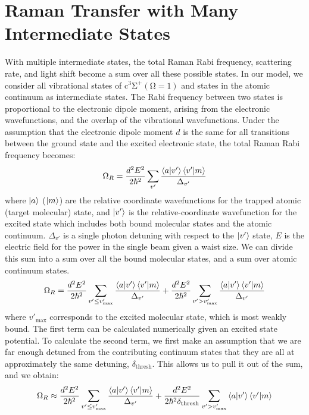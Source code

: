 \documentclass[aps,secnumarabic,amsmath,amssymb,10pt,superscriptaddress]{revtex4}
\begin{document}
\section{Raman Transfer with Many Intermediate States} \label{sm:sect_2}
With multiple intermediate states, the total Raman Rabi frequency, scattering rate, and light shift become a sum over all these possible states. In our model, we consider all vibrational states of $ \mathrm{c^3\Sigma^+(\Omega = 1)} $ and states in the atomic continuum as intermediate states. The Rabi frequency between two states is proportional to the electronic dipole moment, arising from the electronic wavefunctions, and the overlap of the vibrational wavefunctions. Under the assumption that the electronic dipole moment $ d $ is the same for all transitions between the ground state and the excited electronic state, the total Raman Rabi frequency becomes:
\begin{equation}
  \Omega_R = \frac{d^2E^2}{2\hbar^2} \displaystyle\sum_{v'} \frac{\braket{a|v'}\braket{v'|m}}{\Delta_{v'}}
\end{equation}
where $\ket{a}$ ($\ket{m}$) are the relative coordinate wavefunctions for the trapped atomic (target molecular) state, and $\ket{v'}$ is the relative-coordinate wavefunction for the excited state which includes both bound molecular states and the atomic continuum. $\Delta_{v'}$ is a single photon detuning with respect to the $\ket{v'}$ state, $ E $ is the electric field for the power in the single beam given a waist size. We can divide this sum into a sum over all the bound molecular states, and a sum over atomic continuum states.
\begin{equation}
  \Omega_R = \frac{d^2E^2}{2\hbar^2}\displaystyle\sum_{v' \leq v'_{\text{max}}} \frac{\braket{a|v'}\braket{v'|m}}{\Delta_{v'}} +  \frac{d^2E^2}{2\hbar^2}\displaystyle\sum_{v' > v'_{\text{max}}} \frac{\braket{a|v'}\braket{v'|m}}{\Delta_{v'}}
\end{equation}
where $ v'_{\text{max}}$ corresponds to the excited molecular state, which is most weakly bound. The first term can be calculated numerically given an excited state potential. To calculate the second term, we first make an assumption that we are far enough detuned from the contributing continuum states that they are all at approximately the same detuning, $ \delta_{\text{thresh}}$. This allows us to pull it out of the sum, and we obtain:
\begin{equation}
  \Omega_R \approx \frac{d^2E^2}{2\hbar^2}\displaystyle\sum_{v' \leq v'_{\text{max}}} \frac{\braket{a|v'}\braket{v'|m}}{\Delta_{v'}} +  \frac{d^2E^2}{2\hbar^2\delta_{\text{thresh}}}\displaystyle\sum_{v' > v'_{\text{max}}} \braket{a|v'}\braket{v'|m}  \label{rabifreq}
\end{equation}
\end{document}
